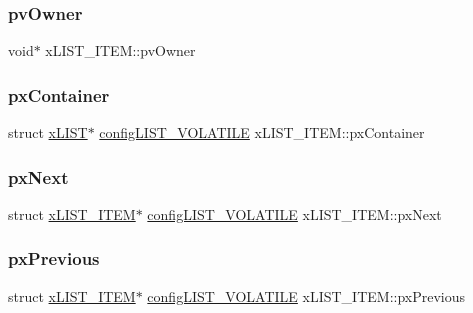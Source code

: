 \subsubsection{\texorpdfstring{pvOwner}{pvOwner}}
{\footnotesize\ttfamily void$\ast$ x\+L\+I\+S\+T\+\_\+\+I\+T\+E\+M\+::pv\+Owner}

\mbox{\label{structx_l_i_s_t___i_t_e_m_afb1e27a88f6b064cd0216de08009844a}} 
\subsubsection{\texorpdfstring{pxContainer}{pxContainer}}
{\footnotesize\ttfamily struct \mbox{\hyperlink{structx_l_i_s_t}{x\+L\+I\+ST}}$\ast$ \mbox{\hyperlink{list_8h_a2d5de557c5561c8980d1bf51d87d8cba}{config\+L\+I\+S\+T\+\_\+\+V\+O\+L\+A\+T\+I\+LE}} x\+L\+I\+S\+T\+\_\+\+I\+T\+E\+M\+::px\+Container}

\mbox{\label{structx_l_i_s_t___i_t_e_m_a03713c4ee953ef5ca6adbec883720c60}} 
\subsubsection{\texorpdfstring{pxNext}{pxNext}}
{\footnotesize\ttfamily struct \mbox{\hyperlink{structx_l_i_s_t___i_t_e_m}{x\+L\+I\+S\+T\+\_\+\+I\+T\+EM}}$\ast$ \mbox{\hyperlink{list_8h_a2d5de557c5561c8980d1bf51d87d8cba}{config\+L\+I\+S\+T\+\_\+\+V\+O\+L\+A\+T\+I\+LE}} x\+L\+I\+S\+T\+\_\+\+I\+T\+E\+M\+::px\+Next}

\mbox{\label{structx_l_i_s_t___i_t_e_m_ae8e553eae41010a8e41c66d76c94110b}} 
\subsubsection{\texorpdfstring{pxPrevious}{pxPrevious}}
{\footnotesize\ttfamily struct \mbox{\hyperlink{structx_l_i_s_t___i_t_e_m}{x\+L\+I\+S\+T\+\_\+\+I\+T\+EM}}$\ast$ \mbox{\hyperlink{list_8h_a2d5de557c5561c8980d1bf51d87d8cba}{config\+L\+I\+S\+T\+\_\+\+V\+O\+L\+A\+T\+I\+LE}} x\+L\+I\+S\+T\+\_\+\+I\+T\+E\+M\+::px\+Previous}

